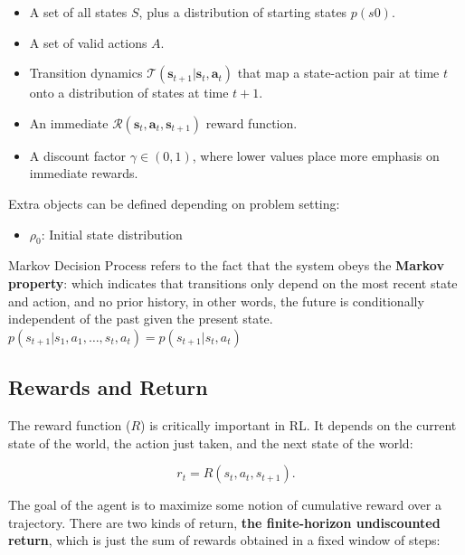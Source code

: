\begin{itemize}
	\item A set of all states \(S\), plus a distribution of starting states \(p(s0)\).
	\item A set of valid actions \(A\).
	\item Transition dynamics $ \mathcal{T}\left(\mathbf{s}_{t+1} | \mathbf{s}_{t}, \mathbf{a}_{t}\right) $ that map a state-action pair at time \(t\) onto a distribution of states at time \(t+1\).
	\item An immediate $ \mathcal{R}\left(\mathbf{s}_{t}, \mathbf{a}_{t}, \mathbf{s}_{t+1}\right) $ reward function.
	\item A discount factor \(\gamma \in(0,1)\), where lower values place more emphasis on immediate rewards.
\end{itemize}

Extra objects can be defined depending on problem setting:
\begin{itemize}
	\item $\rho_0$: Initial state distribution
\end{itemize}

Markov Decision Process refers to the fact that the system obeys the \textbf{Markov property}: which indicates that transitions only depend on the most recent state and action, and no prior history, in other words, the future is conditionally independent of the past given the present state. $ p\left(s_{t+1} | s_{1}, a_{1}, \ldots, s_{t}, a_{t}\right)=p\left(s_{t+1} | s_{t}, a_{t}\right) $


\subsection{Rewards and Return}

The reward function (\(R\)) is critically important in RL. It depends on the current state of the world, the action just taken, and the next state of the world:

\begin{center}
	\begin{equation}
		r_{t}=R\left(s_{t}, a_{t}, s_{t+1}\right).
	\end{equation}
\end{center}

The goal of the agent is to maximize some notion of cumulative reward over a trajectory. There are two kinds of return, \textbf{the finite-horizon undiscounted return}, which is just the sum of rewards obtained in a fixed window of steps:

